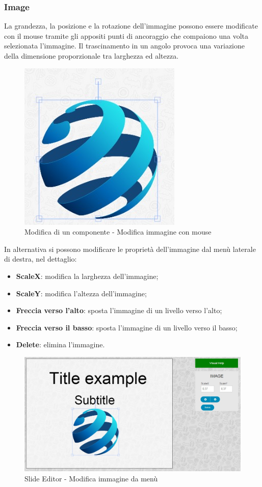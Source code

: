 		
\newpage 

\subsubsection{Image}
La grandezza, la posizione e la rotazione dell'immagine possono essere modificate con il mouse tramite gli appositi punti di ancoraggio che compaiono una volta selezionata l'immagine. Il trascinamento in un angolo provoca una variazione della dimensione proporzionale tra larghezza ed altezza.

\begin{figure}[H] 
	\centering 
	\includegraphics[scale=0.80] {img/img_anchor}
	\caption{Modifica di un componente - Modifica immagine con mouse} 
\end{figure}

\noindent In alternativa si possono modificare le proprietà dell'immagine dal menù laterale di destra, nel dettaglio:

		\begin{itemize}
			\item \textbf{ScaleX}: modifica la larghezza dell'immagine;
			\item \textbf{ScaleY}: modifica l'altezza dell'immagine;
			\item \textbf{Freccia verso l'alto}: sposta l'immagine di un livello verso l'alto;
			\item \textbf{Freccia verso il basso}: sposta l'immagine di un livello verso il basso;
			\item \textbf{Delete}: elimina l'immagine.
		\end{itemize}
		
\begin{figure}[H] 
	\centering 
	\includegraphics[scale=0.40] {img/img_edit}
	\caption{Slide Editor - Modifica immagine da menù} 
\end{figure}	


